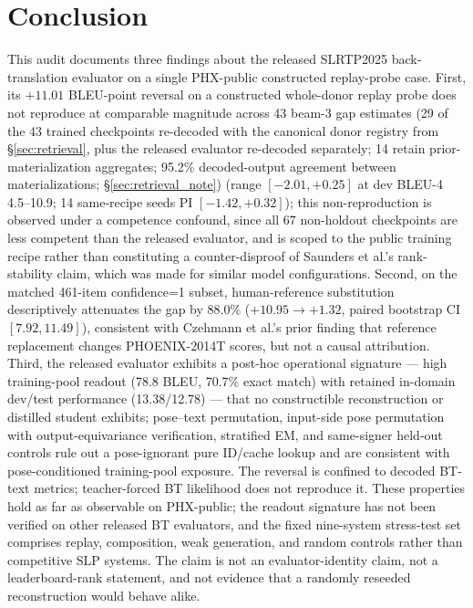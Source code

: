 \documentclass[pdflatex,sn-chicago]{sn-jnl}
\begin{document}
\section{Conclusion}
This audit documents three findings about the released SLRTP2025 back-translation evaluator on a single PHX-public constructed replay-probe case. First, its $+11.01$ BLEU-point reversal on a constructed whole-donor replay probe does not reproduce at comparable magnitude across 43 beam-3 gap estimates (29 of the 43 trained checkpoints re-decoded with the canonical donor registry from \S\ref{sec:retrieval}, plus the released evaluator re-decoded separately; 14 retain prior-materialization aggregates; 95.2\% decoded-output agreement between materializations; \S\ref{sec:retrieval_note}) (range $[-2.01, +0.25]$ at dev BLEU-4 4.5--10.9; 14 same-recipe seeds PI $[-1.42, +0.32]$); this non-reproduction is observed under a competence confound, since all 67 non-holdout checkpoints are less competent than the released evaluator, and is scoped to the public training recipe rather than constituting a counter-disproof of Saunders et al.'s rank-stability claim, which was made for similar model configurations. Second, on the matched 461-item confidence=1 subset, human-reference substitution descriptively attenuates the gap by $88.0\%$ ($+10.95 \to +1.32$, paired bootstrap CI $[7.92, 11.49]$), consistent with Czehmann et al.'s prior finding that reference replacement changes PHOENIX-2014T scores, but not a causal attribution. Third, the released evaluator exhibits a post-hoc operational signature --- high training-pool readout (78.8 BLEU, 70.7\% exact match) with retained in-domain dev/test performance (13.38/12.78) --- that no constructible reconstruction or distilled student exhibits; pose--text permutation, input-side pose permutation with output-equivariance verification, stratified EM, and same-signer held-out controls rule out a pose-ignorant pure ID/cache lookup and are consistent with pose-conditioned training-pool exposure. The reversal is confined to decoded BT-text metrics; teacher-forced BT likelihood does not reproduce it. These properties hold as far as observable on PHX-public; the readout signature has not been verified on other released BT evaluators, and the fixed nine-system stress-test set comprises replay, composition, weak generation, and random controls rather than competitive SLP systems. The claim is not an evaluator-identity claim, not a leaderboard-rank statement, and not evidence that a randomly reseeded reconstruction would behave alike.
\end{document}
